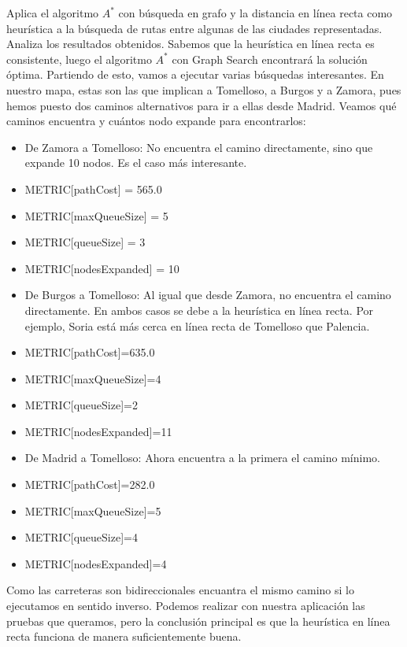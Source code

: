 \documentclass[11pt, a4paper, spanish, openright, twoside]{book}
\begin{document}
	\begin{section}{Aplica el algoritmo $A^*$ con búsqueda en grafo y la distancia en línea recta como heurística a la búsqueda de rutas entre algunas de las ciudades representadas. Analiza los resultados obtenidos.}
			Sabemos que la heurística en línea recta es consistente, luego el algoritmo $A^*$ con Graph Search encontrará la solución óptima. Partiendo de esto, vamos a ejecutar varias búsquedas interesantes. 
			En nuestro mapa, estas son las que implican a Tomelloso, a Burgos y a Zamora, pues hemos puesto dos caminos alternativos para ir a ellas desde Madrid. Veamos qué caminos encuentra y cuántos nodo expande para encontrarlos:
			
			\begin{itemize}
				\begin{itemize}
				\item De Zamora a Tomelloso: No encuentra el camino directamente, sino que expande 10 nodos. Es el caso más interesante.

					\item METRIC[pathCost] = 565.0
					\item METRIC[maxQueueSize] = 5
					\item METRIC[queueSize] = 3
					\item METRIC[nodesExpanded] = 10
				\end{itemize}

				\begin{itemize}
				\item De Burgos a Tomelloso: Al igual que desde Zamora, no encuentra el camino directamente. En ambos casos se debe a la heurística en línea recta. Por ejemplo, Soria está 
						más cerca en línea recta de Tomelloso que Palencia.

					\item METRIC[pathCost]=635.0
					\item METRIC[maxQueueSize]=4
					\item METRIC[queueSize]=2
					\item METRIC[nodesExpanded]=11
				\end{itemize}
			

				\begin{itemize}
				\item De Madrid a Tomelloso: Ahora encuentra a la primera el camino mínimo.
					\item METRIC[pathCost]=282.0
					\item METRIC[maxQueueSize]=5
					\item METRIC[queueSize]=4
					\item METRIC[nodesExpanded]=4
				\end{itemize}


				
			\end{itemize}

				Como las carreteras son bidireccionales encuantra el mismo camino si lo ejecutamos en sentido inverso. Podemos realizar con nuestra aplicación las pruebas que queramos, pero 
				la conclusión principal es que la heurística en línea recta funciona de manera suficientemente buena.
	\end{section}
\end{document}
